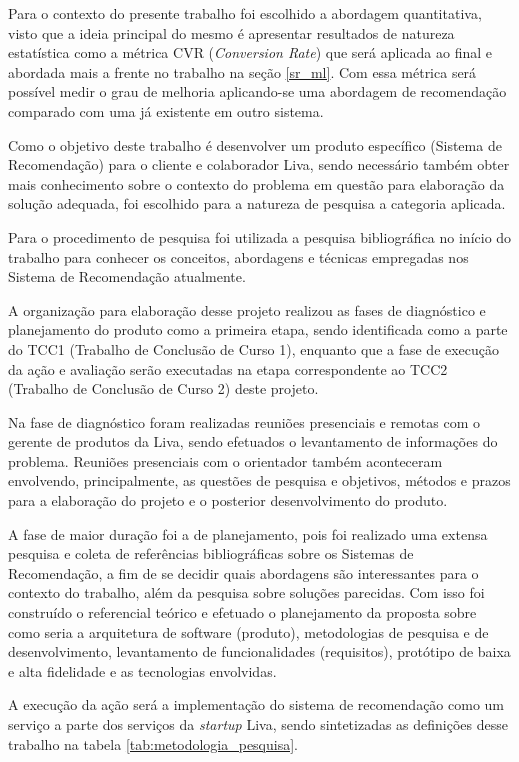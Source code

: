 Para o contexto do presente trabalho foi escolhido a abordagem quantitativa, visto que a ideia principal do mesmo é apresentar resultados de natureza estatística como a métrica CVR (\textit{Conversion Rate}) que será aplicada ao final e abordada mais a frente no trabalho na seção \ref{sr_ml}. Com essa métrica será possível medir o grau de melhoria aplicando-se uma abordagem de recomendação comparado com uma já existente em outro sistema.

Como o objetivo deste trabalho é desenvolver um produto específico (Sistema de Recomendação) para o cliente e colaborador Liva, sendo necessário também obter mais conhecimento sobre o contexto do problema em questão para elaboração da solução adequada, foi escolhido para a natureza de pesquisa a categoria aplicada.

Para o procedimento de pesquisa foi utilizada a pesquisa bibliográfica no início do trabalho para conhecer os conceitos, abordagens e técnicas empregadas nos Sistema de Recomendação atualmente.

A organização para elaboração desse projeto realizou as fases de diagnóstico e planejamento do produto como a primeira etapa, sendo identificada como a parte do TCC1 (Trabalho de Conclusão de Curso 1), enquanto que a fase de execução da ação e avaliação serão executadas na etapa correspondente ao TCC2 (Trabalho de Conclusão de Curso 2) deste projeto.

Na fase de diagnóstico foram realizadas reuniões presenciais e remotas com o gerente de produtos da Liva, sendo efetuados o levantamento de informações do problema. Reuniões presenciais com o orientador também aconteceram envolvendo, principalmente, as questões de pesquisa e objetivos, métodos e prazos para a elaboração do projeto e o posterior desenvolvimento do produto.

A fase de maior duração foi a de planejamento, pois foi realizado uma extensa pesquisa e coleta de referências bibliográficas sobre os Sistemas de Recomendação, a fim de se decidir quais abordagens são interessantes para o contexto do trabalho, além da pesquisa sobre soluções parecidas. Com isso foi construído o referencial teórico e efetuado o planejamento da proposta sobre como seria a arquitetura de software (produto), metodologias de pesquisa e de desenvolvimento, levantamento de funcionalidades (requisitos), protótipo de baixa e alta fidelidade e as tecnologias envolvidas.

A execução da ação será a implementação do sistema de recomendação como um serviço a parte dos serviços da \textit{startup} Liva, sendo sintetizadas as definições desse trabalho na tabela \ref{tab:metodologia_pesquisa}.

